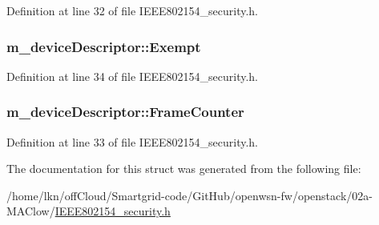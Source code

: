 Definition at line 32 of file I\+E\+E\+E802154\+\_\+security.\+h.

\subsubsection[{\texorpdfstring{Exempt}{Exempt}}]{ m\+\_\+device\+Descriptor\+::\+Exempt}\hypertarget{structm__device_descriptor_a3197c4d946df2990a30de0e282d96ff9}{}\label{structm__device_descriptor_a3197c4d946df2990a30de0e282d96ff9}


Definition at line 34 of file I\+E\+E\+E802154\+\_\+security.\+h.

\subsubsection[{\texorpdfstring{Frame\+Counter}{FrameCounter}}]{ m\+\_\+device\+Descriptor\+::\+Frame\+Counter}\hypertarget{structm__device_descriptor_a7506cf717e15b760cbbcfd9fc001eb87}{}\label{structm__device_descriptor_a7506cf717e15b760cbbcfd9fc001eb87}


Definition at line 33 of file I\+E\+E\+E802154\+\_\+security.\+h.



The documentation for this struct was generated from the following file\+:\begin{DoxyCompactItemize}
\item 
/home/lkn/off\+Cloud/\+Smartgrid-\/code/\+Git\+Hub/openwsn-\/fw/openstack/02a-\/\+M\+A\+Clow/\hyperlink{_i_e_e_e802154__security_8h}{I\+E\+E\+E802154\+\_\+security.\+h}\end{DoxyCompactItemize}
